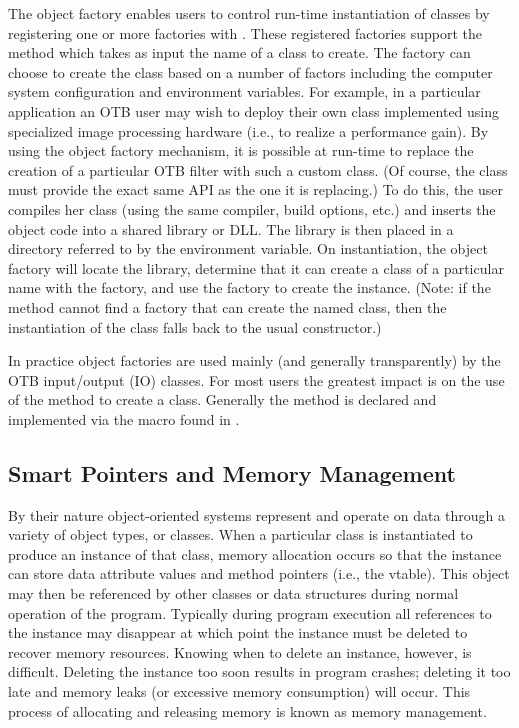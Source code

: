 The object factory enables users to control run-time instantiation of classes
by registering one or more factories with . These
registered factories support the method 
which takes as input the name of a class to create. The factory can choose to
create the class based on a number of factors including the computer system
configuration and environment variables. For example, in a particular
application an OTB user may wish to deploy their own class implemented using
specialized image processing hardware (i.e., to realize a performance
gain). By using the object factory mechanism, it is possible at run-time to
replace the creation of a particular OTB filter with such a custom class. (Of
course, the class must provide the exact same API as the one it is
replacing.) To do this, the user compiles her class (using the same compiler,
build options, etc.) and inserts the object code into a shared library or
DLL. The library is then placed in a directory referred to by the
 environment variable. On instantiation, the object
factory will locate the library, determine that it can create a class of a
particular name with the factory, and use the factory to create the
instance. (Note: if the  method cannot find a factory
that can create the named class, then the instantiation of the class falls
back to the usual constructor.)

In practice object factories are used mainly (and generally transparently) by
the OTB input/output (IO) classes. For most users the greatest impact is on
the use of the  method to create a class. Generally the
 method is declared and implemented via the macro
 found in .


\subsection{Smart Pointers and Memory Management}
\label{sec:SmartPointers}


By their nature object-oriented systems represent and operate on data through
a variety of object types, or classes. When a particular class is
instantiated to produce an instance of that class, memory allocation occurs
so that the instance can store data attribute values and method pointers
(i.e., the vtable). This object may then be referenced by other classes or
data structures during normal operation of the program. Typically during
program execution all references to the instance may disappear at which point
the instance must be deleted to recover memory resources. Knowing when to
delete an instance, however, is difficult. Deleting the instance too soon
results in program crashes; deleting it too late and memory leaks (or
excessive memory consumption) will occur. This process of allocating and
releasing memory is known as memory management.


